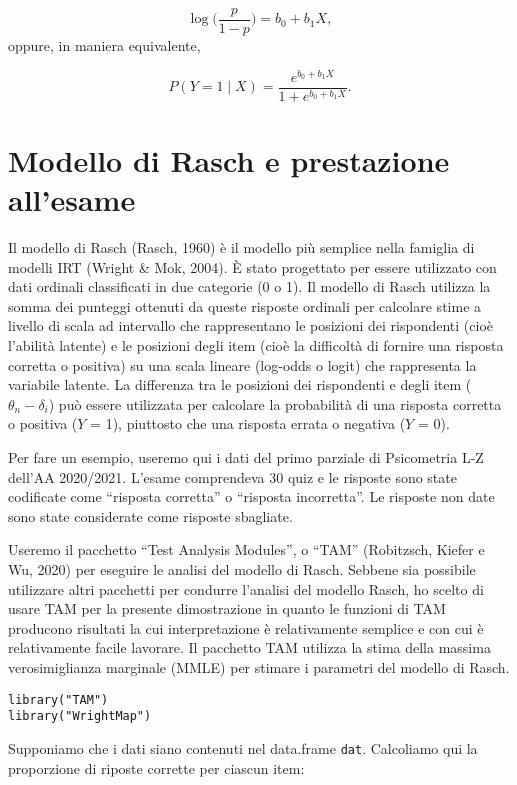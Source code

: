 $$
\log \Big(\frac{p}{1-p} \Big) = b_0 + b_1 X,
$$
oppure, in maniera equivalente,

$$
P(Y = 1 \mid X) = \frac{e^{b_0 + b_1 X}}{1 + e^{b_0 + b_1 X}}.
$$

\section{Modello di Rasch e prestazione all'esame}

Il modello di Rasch (Rasch, 1960) è il modello più semplice nella famiglia di modelli IRT (Wright \& Mok, 2004). 
È stato progettato per essere utilizzato con dati ordinali classificati in due categorie (0 o 1). 
Il modello di Rasch utilizza la somma dei punteggi ottenuti da queste risposte ordinali per calcolare stime a livello di scala ad intervallo che rappresentano le posizioni dei rispondenti (cioè l'abilità latente) e le posizioni degli item (cioè la difficoltà di fornire una risposta corretta o positiva) su una scala lineare (log-odds o logit) che rappresenta la variabile latente. 
La differenza tra le posizioni dei rispondenti e degli item ($\theta_n - \delta_i$) può essere utilizzata per calcolare la probabilità di una risposta corretta o positiva ($Y$ = 1), piuttosto che una risposta errata o negativa ($Y$ = 0).

Per fare un esempio, useremo qui i dati del primo parziale di Psicometria L-Z dell'AA 2020/2021.
L'esame comprendeva 30 quiz e le risposte sono state codificate come ``risposta corretta'' o ``risposta incorretta''.
Le risposte non date sono state considerate come risposte sbagliate.

Useremo il pacchetto ``Test Analysis Modules'', o ``TAM'' (Robitzsch, Kiefer e Wu, 2020) per eseguire le analisi del modello di Rasch. 
Sebbene sia possibile utilizzare altri pacchetti \R\; per condurre l'analisi  del modello Rasch, ho scelto di usare TAM per la presente dimostrazione in quanto le funzioni di TAM producono risultati la cui interpretazione è relativamente semplice e con cui è relativamente facile lavorare.
Il pacchetto TAM utilizza la stima della massima verosimiglianza marginale (MMLE) per stimare i parametri del modello di Rasch. 

\begin{lstlisting}
library("TAM")
library("WrightMap")
\end{lstlisting} 
Supponiamo che i dati siano contenuti nel data.frame \texttt{dat}.
Calcoliamo qui la proporzione di riposte corrette per ciascun item:

